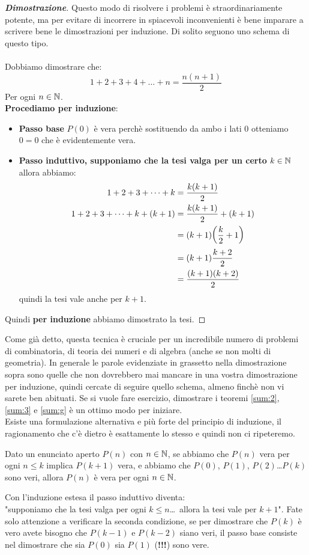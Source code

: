 \documentclass[11pt]{scrartcl}
\begin{document}
\begin{proof}[\textbf{Dimostrazione}]
		Questo modo di risolvere i problemi è straordinariamente potente, ma per evitare di incorrere in spiacevoli inconvenienti è bene imparare a scrivere bene le dimostrazioni per induzione. Di solito seguono uno schema di questo tipo.
		\\
		\\
		Dobbiamo dimostrare che:
		$$1+2+3+4+\dots+n=\frac{n(n+1)}{2}$$
		Per ogni $n\in\mathbb N$.\\
		\textbf{Procediamo per induzione}:
		\begin{itemize}
			\item \textbf{Passo base} $P(0)$ è vera perchè sostituendo da ambo i lati $0$ otteniamo $0=0$ che è evidentemente vera.
			\item \textbf{Passo induttivo, supponiamo che la tesi valga per un certo $k\in\mathbb N$} allora abbiamo:
			\begin{equation}\notag
				\begin{split}
					1+2+3+\dots+k & = \frac{k(k+1)}{2} \\
					1+2+3+\dots+k+(k+1) & = \frac{k(k+1)}{2}+(k+1) \\
					& = (k+1)\bigg(\frac{k}{2}+1\bigg) \\
					& = (k+1)\frac{k+2}{2} \\
					& = \frac{(k+1)(k+2)}{2}
				\end{split}
			\end{equation}
			quindi la tesi vale anche per $k+1$.
		\end{itemize}
		Quindi \textbf{per induzione} abbiamo dimostrato la tesi.
	\end{proof}
	Come già detto, questa tecnica è cruciale per un incredibile numero di problemi di combinatoria, di teoria dei numeri e di algebra (anche se non molti di geometria). In generale le parole evidenziate in grassetto nella dimostrazione sopra sono quelle che non dovrebbero mai mancare in una vostra dimostrazione per induzione, quindi cercate di seguire quello schema, almeno finchè non vi sarete ben abituati. Se si vuole fare esercizio, dimostrare i teoremi \ref{sum:2}, \ref{sum:3} e \ref{sum:g} è un ottimo modo per iniziare.
	\\
	Esiste una formulazione alternativa e più forte del principio di induzione, il ragionamento che c'è dietro è esattamente lo stesso e quindi non ci ripeteremo.
	\begin{proposition}
		Dato un enunciato aperto $P(n)$ con $n\in\mathbb N$, se abbiamo che $P(n)$ vera per ogni $n\le k$ implica $P(k+1)$ vera, e abbiamo che $P(0)$, $P(1)$, $P(2)$\dots $P(k)$ sono veri, allora $P(n)$ è vera per ogni $n\in\mathbb N$.
	\end{proposition}
	Con l'induzione estesa il passo induttivo diventa:\\
	"supponiamo che la tesi valga per ogni $k\le n$\dots \, allora la tesi vale per $k+1$". Fate solo attenzione a verificare la seconda condizione, se per dimostrare che $P(k)$ è vero avete bisogno che $P(k-1)$ e $P(k-2)$ siano veri, il passo base consiste nel dimostrare che sia $P(0)$ sia $P(1)$ (\textbf{!!!}) sono vere.
	
\end{document}
